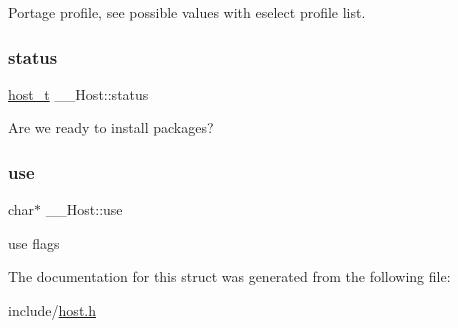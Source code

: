 Portage profile, see possible values with eselect profile list. 

\mbox{\label{struct_____host_a0a366a15966b166891ba8451009df63d}} 
\subsubsection{\texorpdfstring{status}{status}}
{\footnotesize\ttfamily \mbox{\hyperlink{host_8h_a1392734739c1e1eba62ebfab3bf7dc92}{host\+\_\+t}} \+\_\+\+\_\+\+Host\+::status}



Are we ready to install packages? 

\mbox{\label{struct_____host_a29d2f3a317a102944ed07955038d827c}} 
\subsubsection{\texorpdfstring{use}{use}}
{\footnotesize\ttfamily char$\ast$ \+\_\+\+\_\+\+Host\+::use}



use flags 



The documentation for this struct was generated from the following file\+:\begin{DoxyCompactItemize}
\item 
include/\mbox{\hyperlink{host_8h}{host.\+h}}\end{DoxyCompactItemize}
